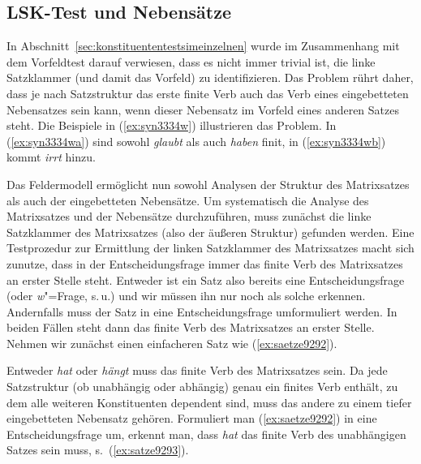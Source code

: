 \subsection{LSK-Test und Nebensätze}

\label{sec:lsktest}

In Abschnitt~\ref{sec:konstituententestsimeinzelnen} wurde im Zusammenhang mit dem Vorfeldtest darauf verwiesen, dass es nicht immer trivial ist, die linke Satzklammer (und damit das Vorfeld) zu identifizieren.
Das Problem rührt daher, dass je nach Satzstruktur das erste finite Verb auch das Verb eines eingebetteten Nebensatzes sein kann, wenn dieser Nebensatz \zB im Vorfeld eines anderen Satzes steht.
Die Beispiele in (\ref{ex:syn3334w}) illustrieren das Problem.
In (\ref{ex:syn3334wa}) sind sowohl \textit{glaubt} als auch \textit{haben} finit, in (\ref{ex:syn3334wb}) kommt \textit{irrt} hinzu.

\begin{exe}
  \ex\label{ex:syn3334w}
  \begin{xlist}
  \end{xlist}
\end{exe}

Das Feldermodell ermöglicht nun sowohl Analysen der Struktur des Matrixsatzes als auch der eingebetteten Nebensätze.
Um systematisch die Analyse des Matrixsatzes und der Nebensätze durchzuführen, muss zunächst die linke Satzklammer des Matrixsatzes (also der äußeren Struktur) gefunden werden.
Eine Testprozedur zur Ermittlung der linken Satzklammer des Matrixsatzes macht sich zunutze, dass in der Entscheidungsfrage immer das finite Verb des Matrixsatzes an erster Stelle steht.
Entweder ist ein Satz also bereits eine Entscheidungsfrage (oder \textit{w}"=Frage, s.\,u.) und wir müssen ihn nur noch als solche erkennen.
Andernfalls muss der Satz in eine Entscheidungsfrage umformuliert werden.
In beiden Fällen steht dann das finite Verb des Matrixsatzes an erster Stelle.
Nehmen wir zunächst einen einfacheren Satz wie (\ref{ex:saetze9292}).

\begin{exe}
\end{exe}

Entweder \textit{hat} oder \textit{hängt} muss das finite Verb des Matrixsatzes sein.
Da jede Satzstruktur (ob unabhängig oder abhängig) genau ein finites Verb enthält, zu dem alle weiteren Konstituenten dependent sind, muss das andere zu einem tiefer eingebetteten Nebensatz gehören.
Formuliert man (\ref{ex:saetze9292}) in eine Entscheidungsfrage um, erkennt man, dass \textit{hat} das finite Verb des unabhängigen Satzes sein muss, s.\ (\ref{ex:satze9293}).

